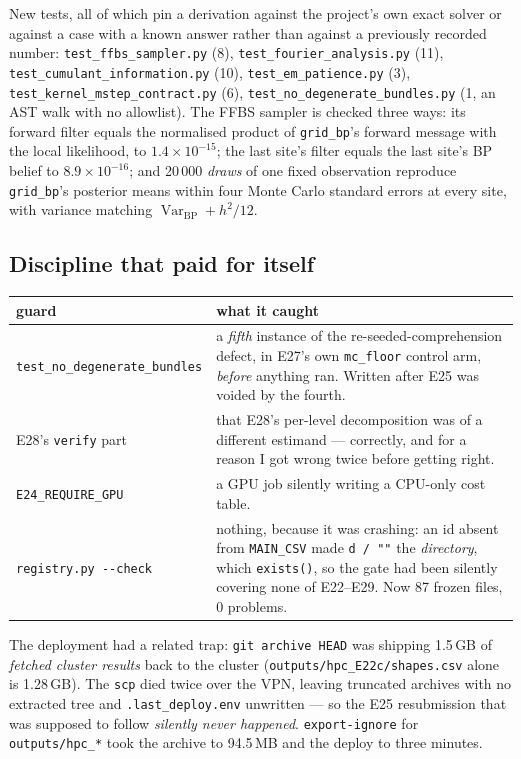 \documentclass[10pt,a4paper]{article}
\newcommand{\code}[1]{\texttt{\small #1}}
\begin{document}
\begin{sloppypar}
New tests, all of which pin a derivation against the project's own exact solver or against a
case with a known answer rather than against a previously recorded number:
\code{test\_ffbs\_sampler.py} (8), \code{test\_fourier\_analysis.py} (11),
\code{test\_cumulant\_information.py} (10), \code{test\_em\_patience.py} (3),
\code{test\_kernel\_mstep\_contract.py} (6), \code{test\_no\_degenerate\_bundles.py} (1, an AST
walk with no allowlist). The FFBS sampler is checked three ways: its forward filter equals the
normalised product of \code{grid\_bp}'s forward message with the local likelihood, to
$1.4\times10^{-15}$; the last site's filter equals the last site's BP belief to
$8.9\times10^{-16}$; and 20\,000
\emph{draws} of one fixed observation reproduce \code{grid\_bp}'s posterior means within four
Monte Carlo standard errors at every site, with variance matching
$\operatorname{Var}_{\mathrm{BP}} + h^2/12$.
\end{sloppypar}

\subsection{Discipline that paid for itself}

\noindent\begin{tabular}{@{}l p{10.8cm}@{}}
\toprule
guard & what it caught \\
\midrule
\code{test\_no\_degenerate\_bundles} & a \emph{fifth} instance of the re-seeded-comprehension
defect, in E27's own \code{mc\_floor} control arm, \emph{before} anything ran. Written after
E25 was voided by the fourth. \\
E28's \code{verify} part & that E28's per-level decomposition was of a different estimand ---
correctly, and for a reason I got wrong twice before getting right. \\
\code{E24\_REQUIRE\_GPU} & a GPU job silently writing a CPU-only cost table. \\
\code{registry.py -{}-check} & nothing, because it was crashing: an id absent from
\code{MAIN\_CSV} made \code{d / ""} the \emph{directory}, which \code{exists()}, so the gate had
been silently covering none of E22--E29. Now 87 frozen files, 0 problems. \\
\bottomrule
\end{tabular}

\medskip
The deployment had a related trap: \code{git archive HEAD} was shipping 1.5\,GB of
\emph{fetched cluster results} back to the cluster (\code{outputs/hpc\_E22c/shapes.csv} alone is
1.28\,GB). The \code{scp} died twice over the VPN, leaving truncated archives with no extracted
tree and \code{.last\_deploy.env} unwritten --- so the E25 resubmission that was supposed to
follow \emph{silently never happened}. \code{export-ignore} for \code{outputs/hpc\_*} took the
archive to 94.5\,MB and the deploy to three minutes.
\end{document}
